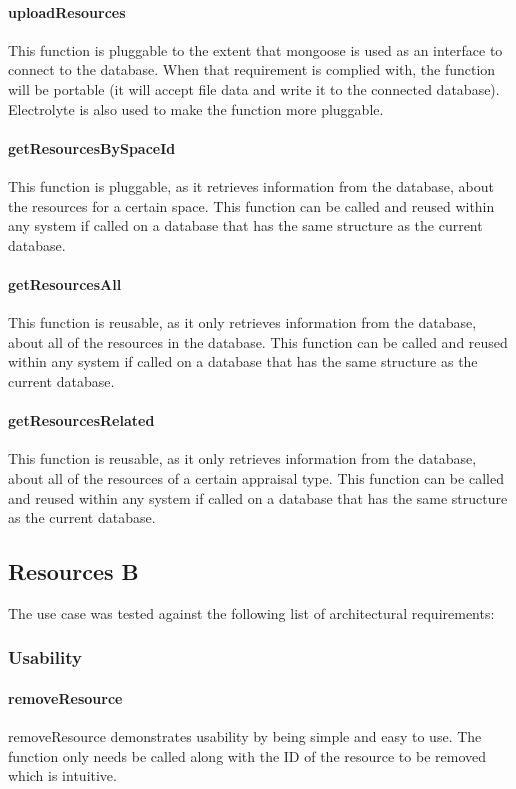 \documentclass[a4paper]{article}
\begin{document}
\paragraph{uploadResources}
This function is pluggable to the extent that mongoose is used as an interface to connect to the database. When that requirement is complied with, the function will be portable (it will accept file data and write it to the connected database). Electrolyte is also used to make the function more pluggable.

\paragraph{getResourcesBySpaceId}
This function is pluggable, as it retrieves information from the database, about the resources for a certain space. This function can be called and reused within any system if called on a database that has the same structure as the current database.

\paragraph{getResourcesAll}
This function is reusable, as it only retrieves information from the database, about all of the resources in the database. This function can be called and reused within any system if called on a database that has the same structure as the current database.

\paragraph{getResourcesRelated}
This function is reusable, as it only retrieves information from the database, about all of the resources of a certain appraisal type. This function can be called and reused within any system if called on a database that has the same structure as the current database.


\subsection {Resources B}
The use case was tested against the following list of architectural requirements:
\subsubsection {Usability}

\paragraph{removeResource}
removeResource demonstrates usability by being simple and easy to use. The function only needs be called along with the ID of the resource to be removed which is intuitive.
\end{document}
